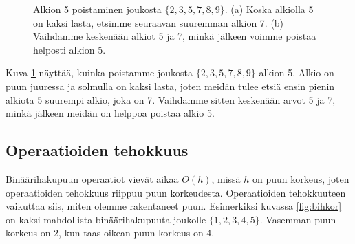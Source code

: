 \begin{figure}
\center
{}
\caption{Alkion 5 poistaminen joukosta $\{2,3,5,7,8,9\}$. (a) Koska alkiolla
5 on kaksi lasta, etsimme seuraavan suuremman alkion 7.
(b) Vaihdamme keskenään alkiot 5 ja 7, minkä jälkeen voimme poistaa helposti alkion 5.}
\label{fig:bihpu3}
\end{figure}

Kuva \ref{fig:bihpu3} näyttää, kuinka poistamme joukosta $\{2,3,5,7,8,9\}$ alkion 5.
Alkio on puun juuressa ja solmulla on kaksi lasta,
joten meidän tulee etsiä ensin pienin alkiota 5 suurempi alkio,
joka on 7.
Vaihdamme sitten keskenään arvot 5 ja 7,
minkä jälkeen meidän on helppoa poistaa alkio 5.

\subsection{Operaatioiden tehokkuus}

Binäärihakupuun operaatiot vievät aikaa $O(h)$,
missä $h$ on puun korkeus, joten operaatioiden tehokkuus
riippuu puun korkeudesta.
Operaatioiden tehokkuuteen vaikuttaa siis,
miten olemme rakentaneet puun.
Esimerkiksi kuvassa \ref{fig:bihkor} on kaksi mahdollista
binäärihakupuuta joukolle $\{1,2,3,4,5\}$.
Vasemman puun korkeus on 2, kun taas oikean puun korkeus on 4.

